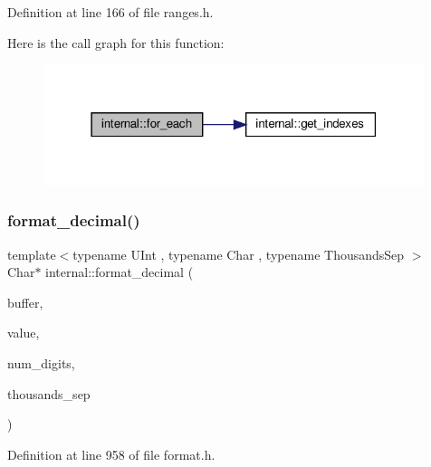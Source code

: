 Definition at line 166 of file ranges.\+h.

Here is the call graph for this function\+:
\nopagebreak
\begin{figure}[H]
\begin{center}
\leavevmode
\includegraphics[width=315pt]{namespaceinternal_ad176bd254de2376b5b51d2aa8fbffed6_cgraph}
\end{center}
\end{figure}
\mbox{\label{namespaceinternal_a40361ef75be4acee6abc19730bdb54e3}} 
\subsubsection{\texorpdfstring{format\+\_\+decimal()}{format\_decimal()}\hspace{0.1cm}{\footnotesize\ttfamily [1/3]}}
{\footnotesize\ttfamily template$<$typename U\+Int , typename Char , typename Thousands\+Sep $>$ \\
Char$\ast$ internal\+::format\+\_\+decimal (\begin{DoxyParamCaption}\item[{Char $\ast$}]{buffer,  }\item[{U\+Int}]{value,  }\item[{int}]{num\+\_\+digits,  }\item[{Thousands\+Sep}]{thousands\+\_\+sep }\end{DoxyParamCaption})\hspace{0.3cm}{\ttfamily [inline]}}



Definition at line 958 of file format.\+h.

